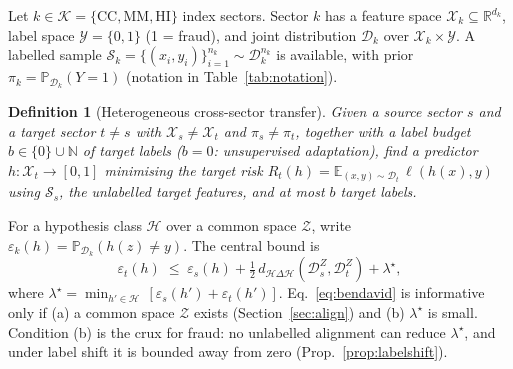 \documentclass[journal]{IEEEtran}
\newtheorem{definition}{Definition}
\newcommand{\R}{\mathbb{R}}
\newcommand{\E}{\mathbb{E}}
\newcommand{\Prob}{\mathbb{P}}
\newcommand{\1}{\mathbf{1}}
\newcommand{\Hspace}{\mathcal{H}}
\newcommand{\Xspace}{\mathcal{X}}
\newcommand{\Zspace}{\mathcal{Z}}
\begin{document}
Let $k\in\mathcal K=\{\mathrm{CC},\mathrm{MM},\mathrm{HI}\}$ index sectors. Sector $k$ has a feature space $\Xspace_k\subseteq\R^{d_k}$, label space $\mathcal Y=\{0,1\}$ (1 = fraud), and joint distribution $\mathcal D_k$ over $\Xspace_k\times\mathcal Y$. A labelled sample $\mathcal S_k=\{(x_i,y_i)\}_{i=1}^{n_k}\sim\mathcal D_k^{n_k}$ is available, with prior $\pi_k=\Prob_{\mathcal D_k}(Y=1)$ (notation in Table~\ref{tab:notation}).

\begin{definition}[Heterogeneous cross-sector transfer]\label{def:problem}
Given a source sector $s$ and a target sector $t\neq s$ with $\Xspace_s\neq\Xspace_t$ and $\pi_s\neq\pi_t$, together with a \emph{label budget} $b\in\{0\}\cup\mathbb N$ of target labels ($b=0$: unsupervised adaptation), find a predictor $h:\Xspace_t\to[0,1]$ minimising the target risk $R_t(h)=\E_{(x,y)\sim\mathcal D_t}\,\ell(h(x),y)$ using $\mathcal S_s$, the unlabelled target features, and at most $b$ target labels.
\end{definition}

For a hypothesis class $\Hspace$ over a common space $\Zspace$, write $\varepsilon_k(h)=\Prob_{\mathcal D_k}(h(z)\neq y)$. The central bound \cite{bendavid2010theory} is
\begin{equation}
\varepsilon_t(h)\;\le\;\varepsilon_s(h)+\tfrac12\,d_{\Hspace\Delta\Hspace}(\mathcal D_s^{Z},\mathcal D_t^{Z})+\lambda^\star,
\label{eq:bendavid}
\end{equation}
where $\lambda^\star=\min_{h'\in\Hspace}\,[\varepsilon_s(h')+\varepsilon_t(h')]$. Eq.~\eqref{eq:bendavid} is informative only if (a) a common space $\Zspace$ exists (Section~\ref{sec:align}) and (b) $\lambda^\star$ is small. Condition (b) is the crux for fraud: no unlabelled alignment can reduce $\lambda^\star$, and under label shift it is bounded away from zero (Prop.~\ref{prop:labelshift}).
\end{document}
